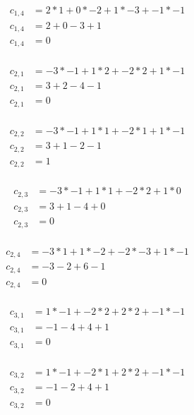 \documentclass[12pt]{article}
\begin{document}
\begin{itemize}
\begin{align*}
    c_{1,4} &= 2 * 1 + 0 * -2 + 1 * -3 + -1 * -1 \\
    c_{1,4} &= 2 + 0 - 3 + 1 \\
    c_{1,4} &= 0 \\
\end{align*}

\begin{align*}
    c_{2,1} &= -3 * -1 + 1 * 2 + -2 * 2 + 1 * -1 \\
    c_{2,1} &= 3 + 2 - 4 - 1 \\
    c_{2,1} &= 0 \\
\end{align*}

\begin{align*}
    c_{2,2} &= -3 * -1 + 1 * 1 + -2 * 1 + 1 * -1 \\
    c_{2,2} &= 3 + 1 - 2 - 1 \\
    c_{2,2} &= 1 \\
\end{align*}

\begin{align*}
    c_{2,3} &= -3 * -1 + 1 * 1 + -2 * 2 + 1 * 0 \\
    c_{2,3} &= 3 + 1 - 4 + 0 \\
    c_{2,3} &= 0 \\
\end{align*}

\begin{align*}
    c_{2,4} &= -3 * 1 + 1 * -2 + -2 * -3 + 1 * -1 \\
    c_{2,4} &= -3 - 2 + 6 - 1 \\
    c_{2,4} &= 0 \\
\end{align*}

\begin{align*}
    c_{3,1} &= 1 * -1 + -2 * 2 + 2 * 2 + -1 * -1 \\
    c_{3,1} &= -1 - 4 + 4 + 1 \\
    c_{3,1} &= 0  \\
\end{align*}

\begin{align*}
    c_{3,2} &= 1 * -1 + -2 * 1 + 2 * 2 + -1 * -1 \\
    c_{3,2} &= -1 - 2 + 4 + 1 \\
    c_{3,2} &= 0  \\
\end{align*}


\end{itemize}
\end{document}
